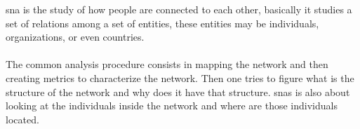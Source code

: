 %
%

\acrfull{sna} is the study of how people are connected to each other, basically it studies a set of relations among a set of entities,
these entities may be individuals, organizations, or even countries.\\\\
\indent The common analysis procedure consists in mapping the network and then creating metrics to
characterize the network. Then one tries to figure what is the structure of the network and why does
it have that structure. \glspl{sna} is also about looking at the individuals inside the network and where are those individuals located.

